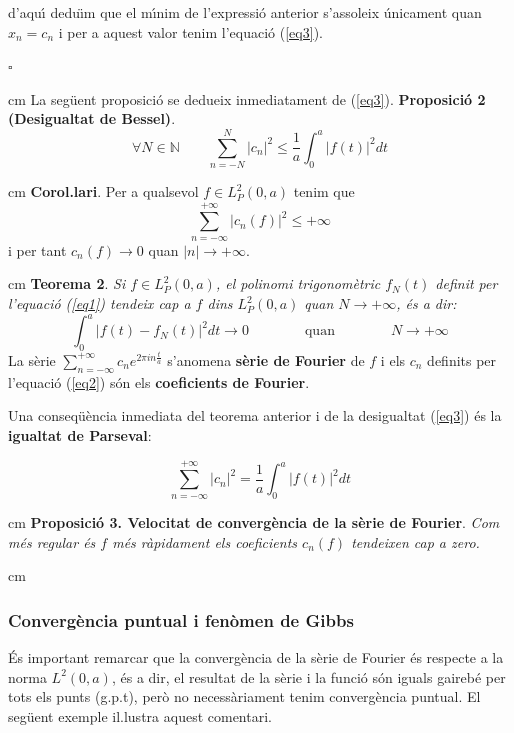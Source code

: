 \documentclass{article}
\def\N{\mathbb N}
\begin{document}
\noindent
d'aqu\'\i $ $ dedu\"\i m que el m\'\i nim de l'expressi\'o anterior s'assoleix
\'unicament quan $x_n=c_n$ i per a aquest valor tenim l'equaci\'o (\ref{eq3}). 

\begin{flushright}
$\square$
\end{flushright}

 cm
\noindent
La seg\"uent proposici\'o se dedueix inmediatament de (\ref{eq3}).
\newline
\noindent
\textbf{Proposici\'o 2 (Desigualtat de Bessel)}. {\it
\[ 
\forall N \in \N \qquad \sum_{n=-N}^N |c_n|^2 \leq 
\frac{1}{a} \int_0^a |f(t)|^2 dt
\]
}
 
 cm
\noindent
\textbf{Corol.lari}. Per a qualsevol $f \in L^2_P(0, a)$ tenim que
\[
\sum_{n=-\infty}^{+\infty} |c_n(f)|^2 \leq +\infty
\]
\noindent
i per tant $c_n(f) \rightarrow 0$ quan $|n| \rightarrow +\infty$.

 cm
\noindent
\textbf{Teorema 2}. {\it
Si $f \in L^2_P(0, a)$, el polinomi trigonom\`etric $f_N(t)$ definit per
l'equaci\'o (\ref{eq1}) tendeix cap a $f$ dins $L^2_P(0, a)$ quan 
$N \rightarrow +\infty$, \'es a dir:
\[
\int_0^a |f(t)-f_N(t)|^2 dt \rightarrow 0 \qquad \qquad \mathrm{quan}
\qquad \qquad N \rightarrow +\infty
\]
}
\noindent
La s\`erie $\sum_{n=-\infty}^{+\infty} c_n e^{2\pi i n \frac{t}{a}}$ s'anomena
{\bf s\`erie de Fourier} de $f$ i els $c_n$ definits per l'equaci\'o 
(\ref{eq2}) s\'on els {\bf coeficients de Fourier}.

\vskip 0.3cm
Una conseq\"u\`encia inmediata del teorema anterior i de la desigualtat
(\ref{eq3}) \'es la {\bf igualtat de Parseval}:

\begin{equation}
\label{eq4}
\sum_{n=-\infty}^{+\infty} |c_n|^2=\frac{1}{a} \int_0^a |f(t)|^2 dt
\end{equation}

 cm
\noindent
\textbf{Proposici\'o 3. Velocitat de converg\`encia de la s\`erie de Fourier}.
{\it Com m\'es regular \'es $f$ m\'es r\`apidament els coeficients $c_n(f)$
tendeixen cap a zero.}

 cm
\subsubsection{Converg\`encia puntual i fen\`omen de Gibbs}
\'Es important remarcar que la converg\`encia de la s\`erie de Fourier 
\'es respecte a la norma $L^2(0, a)$, \'es a dir, el resultat de la s\`erie
i la funci\'o s\'on iguals gaireb\'e per tots els punts (g.p.t), per\`o
no necess\`ariament tenim converg\`encia puntual.
El seg\"uent exemple il.lustra aquest comentari.
\end{document}
